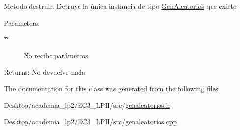 Metodo destruir. Detruye la única instancia de tipo \hyperlink{classGenAleatorios}{GenAleatorios} que existe \begin{Desc}
\item[Parameters:]
\begin{description}
\item[{\em \char`\"{}\char`\"{}}]No recibe parámetros \end{description}
\end{Desc}
\begin{Desc}
\item[Returns:]No devuelve nada \end{Desc}


The documentation for this class was generated from the following files:\begin{CompactItemize}
\item 
Desktop/academia\_\-lp2/EC3\_\-LPII/src/\hyperlink{genaleatorios_8h}{genaleatorios.h}\item 
Desktop/academia\_\-lp2/EC3\_\-LPII/src/\hyperlink{genaleatorios_8cpp}{genaleatorios.cpp}\end{CompactItemize}
